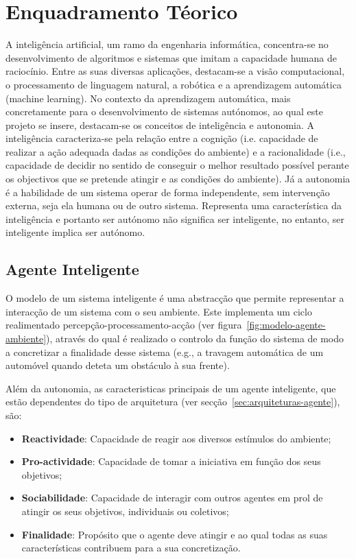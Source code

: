 \chapter{Enquadramento Téorico}\label{ch:enquadramento-teorico}

A inteligência artificial, um ramo da engenharia informática, concentra-se no desenvolvimento de algoritmos e sistemas que imitam a capacidade humana de raciocínio.
Entre as suas diversas aplicações, destacam-se a visão computacional, o processamento de linguagem natural, a robótica e a aprendizagem automática (machine learning).
No contexto da aprendizagem automática, mais concretamente para o desenvolvimento de sistemas autónomos, ao qual este projeto se insere, destacam-se os conceitos de inteligência e autonomia.
A inteligência caracteriza-se pela relação entre a cognição (i.e. capacidade de realizar a ação adequada dadas as condições do ambiente) e a racionalidade (i.e., capacidade de decidir no sentido de conseguir o melhor resultado possível perante os objectivos que se pretende atingir e as condições do ambiente).
Já a autonomia é a habilidade de um sistema operar de forma independente, sem intervenção externa, seja ela humana ou de outro sistema.
Representa uma característica da inteligência e portanto ser autónomo não significa ser inteligente, no entanto, ser inteligente implica ser autónomo.


\section{Agente Inteligente}\label{sec:agente-inteligente}
O modelo de um sistema inteligente é uma abstracção que permite representar a interacção de um sistema com o seu ambiente.
Este implementa um ciclo realimentado percepção-processamento-acção (ver figura~\ref{fig:modelo-agente-ambiente}), através do qual é realizado o controlo da função do sistema de modo a concretizar a finalidade desse sistema (e.g., a travagem automática de um automóvel quando deteta um obstáculo à sua frente).

Além da autonomia, as caracteristicas principais de um agente inteligente, que estão dependentes do tipo de arquitetura (ver secção~\ref{sec:arquiteturas-agente}), são:

\begin{itemize}
    \item \textbf{Reactividade}: Capacidade de reagir aos diversos estímulos do ambiente;
    \item \textbf{Pro-actividade}: Capacidade de tomar a iniciativa em função dos seus objetivos;
    \item \textbf{Sociabilidade}: Capacidade de interagir com outros agentes em prol de atingir os seus objetivos, individuais ou coletivos;
    \item \textbf{Finalidade}: Propósito que o agente deve atingir e ao qual todas as suas características contribuem para a sua concretização.
\end{itemize}

